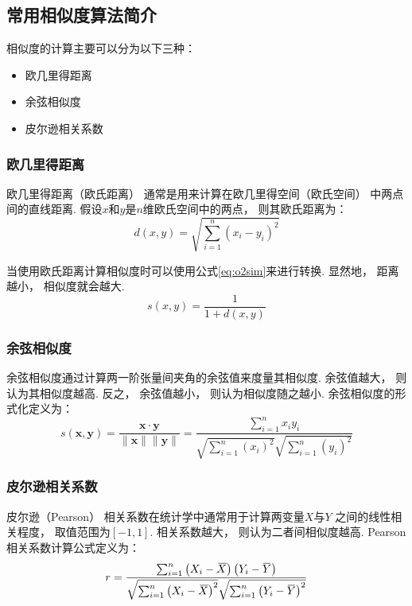 \subsection{常用相似度算法简介}

相似度的计算主要可以分为以下三种\cite{heJiYuJuanJiShenJingWangLuoDeYinLeTuiJianXiTong2019}：
\begin{itemize}
    \item 欧几里得距离
    \item 余弦相似度
    \item 皮尔逊相关系数
\end{itemize}

\subsubsection{欧几里得距离}

欧几里得距离（欧氏距离）
通常是用来计算在欧几里得空间（欧氏空间）
中两点间的直线距离.
假设$x$和$y$是$n$维欧氏空间中的两点，
则其欧氏距离为：
\begin{equation}
    d(x,y)=\sqrt{ \sum_{i=1}^n {\left( x_i - y_i \right)}^2}
\end{equation}

当使用欧氏距离计算相似度时可以使用公式\cref{eq:o2sim}来进行转换.
显然地，
距离越小，
相似度就会越大.
\begin{equation}
    \label{eq:o2sim}
    s(x,y)=\frac{1}{1+d(x,y)}
\end{equation}

\subsubsection{余弦相似度}

余弦相似度通过计算两一阶张量间夹角的余弦值来度量其相似度.
余弦值越大，
则认为其相似度越高.
反之，
余弦值越小，
则认为相似度随之越小.
余弦相似度的形式化定义为：
\begin{equation}
    s(\mathbf{x},\mathbf{y})=
    \frac{\mathbf{x}\cdot\mathbf{y}}{\lVert\mathbf{x}\rVert\lVert\mathbf{y}\rVert}
    =\frac{\sum_{i=1}^n x_i y_i} {\sqrt{\sum_{i=1}^n{\left(x_i\right)}^2} \sqrt{\sum_{i=1}^n{\left(y_i\right)}^2}}
\end{equation}

\subsubsection{皮尔逊相关系数}

皮尔逊（Pearson）
相关系数在统计学中通常用于计算两变量$X$与$Y$
之间的线性相关程度，
取值范围为$\left[-1,1\right]$.
相关系数越大，
则认为二者间相似度越高.
Pearson相关系数计算公式定义为：
\begin{equation}
    r=\frac{\sum_{i=1}^n\left(X_i-\overbari{X}\right)\left(Y_i-\overbar{Y}\right)}{\sqrt{\sum_{i=1}^n{\left(X_i-\overbari{X}\right)}^2}\sqrt{\sum_{i=1}^n{\left(Y_i-\overbar{Y}\right)}^2}}
\end{equation}
